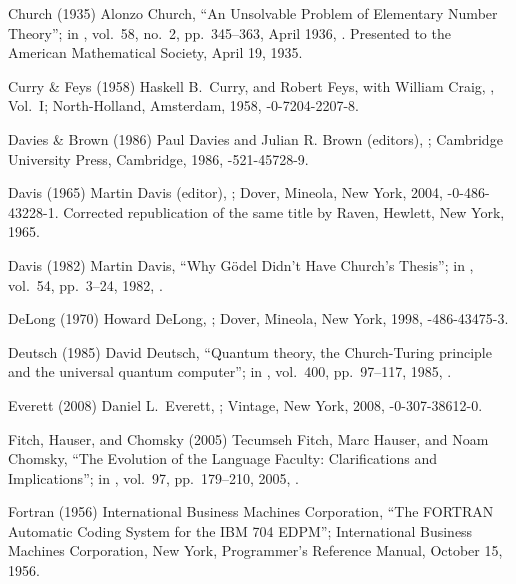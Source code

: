  Church (1935)
Alonzo Church,
``An Unsolvable Problem of Elementary Number Theory'';
in ,
vol.\ 58, no.\ 2, pp.\ 345--363, April 1936,
.
Presented to the American Mathematical Society,
April 19, 1935.

 Curry \& Feys (1958)
Haskell B.\ Curry, and
Robert Feys, with
William  Craig,
, Vol.\ I;
North-Holland, Amsterdam, 1958,
-0-7204-2207-8.

 Davies \& Brown (1986)
Paul Davies and Julian R. Brown (editors),
;
Cambridge University Press, Cambridge, 1986,
-521-45728-9.

 Davis (1965)
Martin Davis (editor),
;
Dover, Mineola, New York, 2004,
-0-486-43228-1.
Corrected republication of the same title
by Raven, Hewlett, New York, 1965.

 Davis (1982)
Martin Davis,
``Why G\"odel Didn't Have Church's Thesis'';
in ,
vol.\ 54, pp.\ 3--24, 1982,
.

 DeLong (1970)
Howard DeLong,
;
Dover, Mineola, New York, 1998,
-486-43475-3.

 Deutsch (1985)
David Deutsch,
``Quantum theory, the Church-Turing principle and
  the universal quantum computer'';
in ,
 vol.\ 400, pp.\ 97--117, 1985,
.

 Everett (2008)
Daniel L.\ Everett,
;
Vintage, New York, 2008,
-0-307-38612-0.

  Fitch, Hauser, and Chomsky (2005)
Tecumseh Fitch, Marc Hauser, and Noam Chomsky,
``The Evolution of the Language Faculty:
Clarifications and Implications'';
in ,
vol.\ 97, pp.\ 179--210, 2005,
.

 Fortran (1956)
International Business Machines Corporation,
``The FORTRAN Automatic Coding System for the IBM 704 EDPM'';
International Business Machines Corporation, New York,
Programmer's Reference Manual, October 15, 1956.

